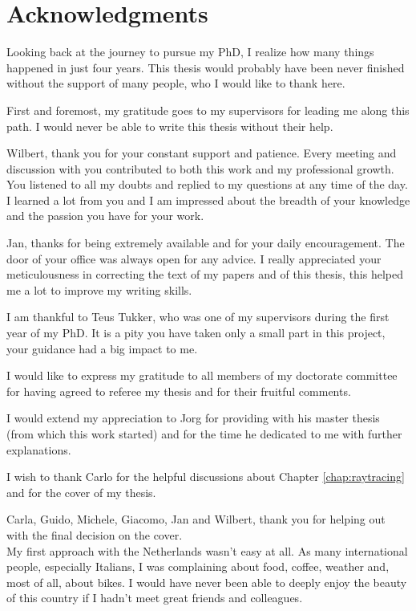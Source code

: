 
\chapter*{Acknowledgments}
\markboth{}{}
Looking back at the journey to pursue my PhD, I realize how many things happened in just four years. This thesis would probably have been never finished without the support of many people, who I would like to thank here.  

First and foremost, my gratitude goes to my supervisors for leading me along this path. I would never be able to write this thesis without their help.

Wilbert, thank you for your constant support and patience. Every meeting and discussion with you contributed to both this work and my professional growth. 
You listened to all my doubts and replied to my questions at any time of the day.
I learned a lot from you and I am impressed about the breadth of your knowledge and the passion you have for your work. 

Jan, thanks for being extremely available and for your daily encouragement. The door of your office was always open for any advice. 
I really appreciated your meticulousness in correcting the text of my papers and of this thesis, this helped me a lot to improve my writing skills.

I am thankful to Teus Tukker, who was one of my supervisors during the first year of my PhD. It is a pity you have taken only a small part in this project, your guidance had a big impact to me.

I would like to express my gratitude to all members of my doctorate committee for having agreed to referee my thesis and for their fruitful comments.  

I would extend my appreciation to Jorg for providing with his master thesis (from which this work started) and for the time he dedicated to me with further explanations.

I wish to thank Carlo for the helpful discussions about Chapter \ref{chap:raytracing} and for the cover of my thesis. 

Carla, Guido, Michele, Giacomo, Jan and Wilbert, thank you for helping out with the final decision on the cover. \\

My first approach with the Netherlands wasn't easy at all. As many international people, especially Italians, I was complaining about food, coffee, weather and, most of all, about bikes. 
I would have never been able to deeply enjoy the beauty of this country if I hadn't meet great friends and colleagues.

